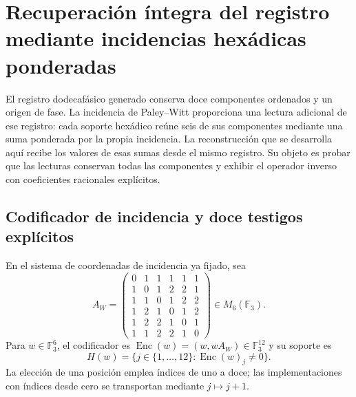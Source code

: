 
\section[Recuperación por incidencias hexádicas]{Recuperación íntegra del registro mediante incidencias hexádicas ponderadas}
\label{rh:sec:recuperacion}

El registro dodecafásico generado conserva doce componentes ordenados y
un origen de fase. La incidencia de Paley--Witt proporciona una lectura
adicional de ese registro: cada soporte hexádico reúne seis de sus
componentes mediante una suma ponderada por la propia incidencia. La
reconstrucción que se desarrolla aquí recibe los valores de esas sumas
desde el mismo registro. Su objeto es probar que las lecturas conservan
todas las componentes y exhibir el operador inverso con coeficientes
racionales explícitos.

\subsection{Codificador de incidencia y doce testigos explícitos}

En el sistema de coordenadas de incidencia ya fijado, sea
\[
A_W=\begin{pmatrix}
0&1&1&1&1&1\\1&0&1&2&2&1\\1&1&0&1&2&2\\
1&2&1&0&1&2\\1&2&2&1&0&1\\1&1&2&2&1&0
\end{pmatrix}\in M_6(\mathbb F_3).
\]
Para $w\in\mathbb F_3^6$, el codificador es
$\operatorname{Enc}(w)=(w,wA_W)\in\mathbb F_3^{12}$ y su soporte
es
\[
H(w)=\{j\in\{1,\ldots,12\}:\operatorname{Enc}(w)_j\ne0\}.
\]
La elección de una posición emplea índices de uno a doce; las
implementaciones con índices desde cero se transportan mediante
$j\mapsto j+1$.

